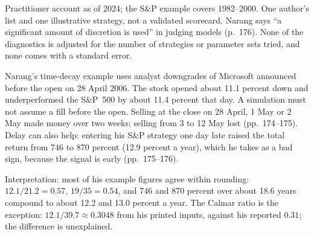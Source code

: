\begin{qfmethod}
 Practitioner account as of 2024; the S\&P example covers 1982--2000. One author's list and one illustrative strategy, not a validated scorecard. Narang says ``a significant amount of discretion is used'' in judging models (p.~176). None of the diagnostics is adjusted for the number of strategies or parameter sets tried, and none comes with a standard error.

 Narang's time-decay example uses analyst downgrades of Microsoft announced before the open on 28 April 2006. The stock opened about 11.1 percent down and underperformed the S\&P~500 by about 11.4 percent that day. A simulation must not assume a fill before the open. Selling at the close on 28 April, 1 May or 2 May made money over two weeks; selling from 3 to 12 May lost (pp.~174--175). Delay can also help: entering his S\&P strategy one day late raised the total return from 746 to 870 percent (12.9 percent a year), which he takes as a bad sign, because the signal is early (pp.~175--176).

Interpretation: most of his example figures agree within rounding: $12.1/21.2=0.57$, $19/35=0.54$, and 746 and 870 percent over about 18.6 years compound to about 12.2 and 13.0 percent a year. The Calmar ratio is the exception: $12.1/39.7\approx0.3048$ from his printed inputs, against his reported $0.31$; the difference is unexplained.


\end{qfmethod}
